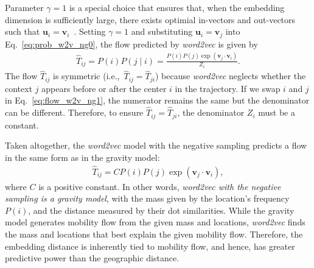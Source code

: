 \documentclass[12pt]{article} %
\def\given{\mid}
\def\ie{i.e.,~}
\begin{document}
Parameter $\gamma=1$ is a special choice that ensures that, when the embedding dimension is sufficiently large, there exists optimial in-vectors and out-vectors such that $\bm{u}_i = \bm{v}_i$~\autocite{levy2014neural}.
Setting $\gamma = 1$ and substituting $\bm{u}_i = \bm{v}_j$ into Eq.~\eqref{eq:prob_w2v_ng0}, the flow predicted by {\it word2vec} is given by
\begin{align}
	\hat{T}_{ij}= P(i) P(j\given i) = \frac{P(i)P(j)\exp(\bm{v}_j \cdot \bm{v}_{i})}{Z_i}. \label{eq:flow_w2v_ng1}
\end{align}
The flow $\hat{T}_{ij}$ is symmetric (\ie $\hat{T}_{ij}=\hat{T}_{ji}$) because {\it word2vec} neglects whether the context $j$ appears before or after the center $i$ in the trajectory.
If we swap $i$ and $j$ in Eq.~\eqref{eq:flow_w2v_ng1}, the numerator remains the same but the denominator can be different.
Therefore, to ensure $\hat{T}_{ij} = \hat{T}_{ji}$, the denominator $Z_i$ must be a constant.

Taken altogether, the {\it word2vec} model with the negative sampling predicts a flow in the same form as in the gravity model:
\begin{align}
	\hat{T}_{ij}=  C P(i) P(j)  \exp(\bm{v}_j \cdot \bm{v}_{i}), \label{eq:flow_w2v_ng0}
\end{align}
where $C$ is a positive constant.
In other words, \emph{word2vec with the negative sampling is a gravity model}, with the mass given by the location's frequency $P(i)$, and the distance measured by their dot similarities.
While the gravity model generates mobility flow from the given mass and locations, {\it word2vec} finds the mass and locations that best explain the given mobility flow.
Therefore, the embedding distance is inherently tied to mobility flow, and hence, has greater predictive power than the geographic distance.
\end{document}
